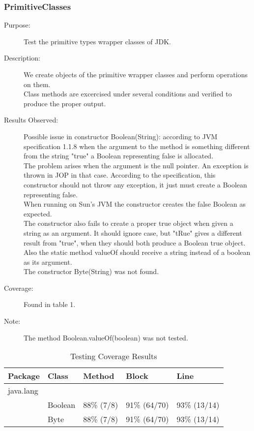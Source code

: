 \subsubsection{PrimitiveClasses}
\begin{description}
   \item[Purpose:]
Test the primitive types wrapper classes of JDK.
    \item[Description:]
We create objects of the primitive wrapper classes and perform operations on them.\\
Class methods are excercised under several conditions and verified
to produce the proper output.
    \item[Results Observed:]
    Possible issue in constructor Boolean(String): according to JVM specification
    1.1.8 when the argument to the method is something different from the string "true"
    a Boolean representing false is allocated.\\
    The problem arises when the argument is the null pointer. An exception is thrown in
    JOP in that case. According to the specification, this constructor should not throw
    any exception, it just must create a Boolean representing false.\\
    When running on Sun's JVM the constructor creates the false Boolean as expected.\\
    The constructor also fails to create a proper true object when given a string as an argument.
    It should ignore case, but "tRue" gives a different result from "true", when they should both
    produce a Boolean true object.\\
    Also the static method valueOf should receive a string instead of a boolean as its argument.\\
    The constructor Byte(String) was not found.
    \item[Coverage:]
    Found in table 1.
    \item[Note:]
The method Boolean.valueOf(boolean) was not tested.
\end{description}

\begin{table}
\begin{center}
\caption{\label{MyTable} Testing Coverage Results}
\begin{tabular}[t]{|l|l|l|l|l|}
\hline
Package & Class & Method & Block & Line \\
\hline
java.lang &  &  &  &  \\
\hline
  & Boolean & 88\% (7/8) & 91\% (64/70)  & 93\% (13/14) \\
\hline
  & Byte & 88\% (7/8) & 91\% (64/70)  & 93\% (13/14) \\
\hline
\end{tabular}
\end{center}
\end{table}
